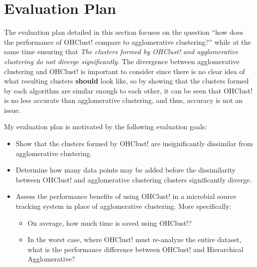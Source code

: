 \documentclass[12pt]{ucthesis}
\begin{document}
   \section{Evaluation Plan}\label{sec:eval_plan}
      The evaluation plan detailed in this section focuses on the question
      ``how does the performance of \textsf{OHClust!} compare to \textsf{agglomerative clustering}?'' while at
      the same time ensuring that \textit{The clusters formed by OHClust! and
      agglomerative clustering do not diverge significantly.} The divergence between
      \textsf{agglomerative clustering} and \textsf{OHClust!} is important to consider since there is no clear idea
      of what resulting clusters \textbf{should} look like, so by showing that
      the clusters formed by each algorithm are similar enough to each other,
      it can be seen that \textsf{OHClust!} is no less accurate than \textsf{agglomerative clustering}, and
      thus, accuracy is not an issue.

      My evaluation plan is motivated by the following evaluation goals:
      \begin{itemize}
         \item Show that the clusters formed by \textsf{OHClust!} are insignificantly
               dissimilar from \textsf{agglomerative clustering}.
         \item Determine how many data points may be added before the
               dissimilarity between \textsf{OHClust!} and \textsf{agglomerative clustering} clusters
               significantly diverge.
         \item Assess the performance benefits of using \textsf{OHClust!} in a
               microbial source tracking system in place of \textsf{agglomerative clustering}. More
               specifically:
               \begin{itemize}
                  \item On average, how much time is saved using \textsf{OHClust!}?
                  \item In the worst case, where \textsf{OHClust!} must re-analyze the
                        entire dataset, what is the performance difference
                        between \textsf{OHClust!} and Hierarchical Agglomerative?
               \end{itemize}
      \end{itemize}
\end{document}
